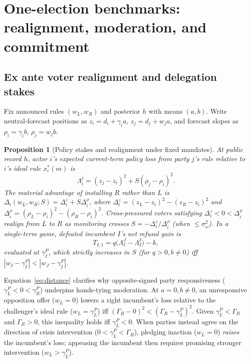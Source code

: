 \documentclass[11pt,letterpaper]{article}
\newtheorem{proposition}{Proposition}
\begin{document}
\section{One-election benchmarks: realignment, moderation, and commitment}\label{sec:prelim}

\subsection{Ex ante voter realignment and delegation stakes}

Fix announced rules $(w_L,w_R)$ and posterior $h$ with means $(a,b)$. Write neutral-forecast positions as $z_i=d_i+\gamma_i a$, $z_j=d_j+w_j a$, and forecast slopes as $\rho_i=\gamma_i b$, $\rho_j=w_j b$.

\begin{proposition}[Policy stakes and realignment under fixed mandates]\label{prop:fixed}
At public record $h$, actor $i$'s expected current-term policy loss from party $j$'s rule relative to $i$'s ideal rule $x_i^*(m)$ is
\begin{equation}
 \Lambda_i^j=(z_j-z_i)^2+S(\rho_j-\rho_i)^2.
 \label{eq:distance}
\end{equation}
The material advantage of installing $R$ rather than $L$ is $\Delta_i(w_L,w_R;S)=\Delta_i^z+S\Delta_i^\rho$, where $\Delta_i^z=(z_L-z_i)^2-(z_R-z_i)^2$ and $\Delta_i^\rho=(\rho_L-\rho_i)^2-(\rho_R-\rho_i)^2$. Cross-pressured voters satisfying $\Delta_i^z<0<\Delta_i^\rho$ realign from $L$ to $R$ as monitoring crosses $S=-\Delta_i^z/\Delta_i^\rho$ (when $\le\sigma_\omega^2$). In a single-term game, defeated incumbent $I$'s net refusal gain is
\begin{equation}
 T_{I,1}=q\big(\Lambda_I^J-\Lambda_I^I\big)-k ,
 \label{eq:termgain}
\end{equation}
evaluated at $\gamma_I^P$, which strictly increases in $S$ (for $q>0,b\ne 0$) iff $|w_I-\gamma_I^P|<|w_J-\gamma_I^P|$.
\end{proposition}

Equation~\eqref{eq:distance} clarifies why opposite-signed party responsiveness ($\gamma_L^P<0<\gamma_R^P$) underpins hands-tying moderation. At $a=0,b\ne 0$, an unresponsive opposition offer ($w_L=0$) lowers a right incumbent's loss relative to the challenger's ideal rule ($w_L=\gamma_L^P$) iff $(\Gamma_R-0)^2<(\Gamma_R-\gamma_L^P)^2$. Given $\gamma_L^P<\Gamma_R$ and $\Gamma_R>0$, this inequality holds iff $\gamma_L^P<0$. When parties instead agree on the direction of crisis intervention ($0<\gamma_L^P<\Gamma_R$), pledging inaction ($w_L=0$) \emph{raises} the incumbent's loss; appeasing the incumbent then requires promising stronger intervention ($w_L>\gamma_L^P$).
\end{document}
